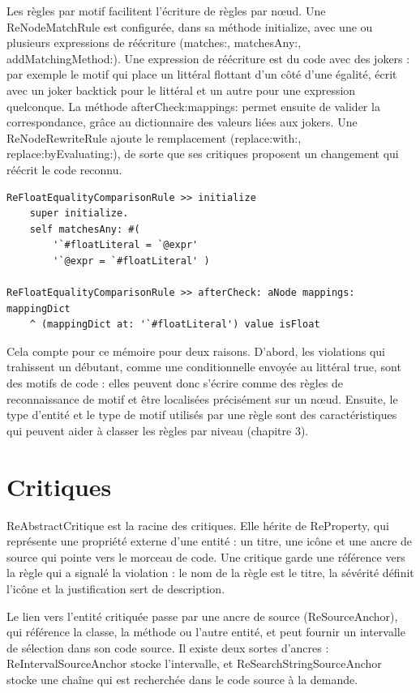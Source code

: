 \documentclass[11pt,a4paper]{report}
\begin{document}
Les règles par motif facilitent l’écriture de règles par nœud. Une ReNodeMatchRule est configurée, dans sa méthode initialize, avec une ou plusieurs expressions de réécriture (matches:, matchesAny:, addMatchingMethod:). Une expression de réécriture est du code avec des jokers : par exemple le motif qui place un littéral flottant d’un côté d’une égalité, écrit avec un joker backtick pour le littéral et un autre pour une expression quelconque. La méthode afterCheck:mappings: permet ensuite de valider la correspondance, grâce au dictionnaire des valeurs liées aux jokers. Une ReNodeRewriteRule ajoute le remplacement (replace:with:, replace:byEvaluating:), de sorte que ses critiques proposent un changement qui réécrit le code reconnu.

\begin{lstlisting}
ReFloatEqualityComparisonRule >> initialize
	super initialize.
	self matchesAny: #(
		'`#floatLiteral = `@expr'
		'`@expr = `#floatLiteral' )

ReFloatEqualityComparisonRule >> afterCheck: aNode mappings: mappingDict
	^ (mappingDict at: '`#floatLiteral') value isFloat
\end{lstlisting}

Cela compte pour ce mémoire pour deux raisons. D’abord, les violations qui trahissent un débutant, comme une conditionnelle envoyée au littéral true, sont des motifs de code : elles peuvent donc s’écrire comme des règles de reconnaissance de motif et être localisées précisément sur un nœud. Ensuite, le type d’entité et le type de motif utilisés par une règle sont des caractéristiques qui peuvent aider à classer les règles par niveau (chapitre 3).

\section{Critiques}
ReAbstractCritique est la racine des critiques. Elle hérite de ReProperty, qui représente une propriété externe d’une entité : un titre, une icône et une ancre de source qui pointe vers le morceau de code. Une critique garde une référence vers la règle qui a signalé la violation : le nom de la règle est le titre, la sévérité définit l’icône et la justification sert de description.

Le lien vers l’entité critiquée passe par une ancre de source (ReSourceAnchor), qui référence la classe, la méthode ou l’autre entité, et peut fournir un intervalle de sélection dans son code source. Il existe deux sortes d’ancres : ReIntervalSourceAnchor stocke l’intervalle, et ReSearchStringSourceAnchor stocke une chaîne qui est recherchée dans le code source à la demande.
\end{document}
